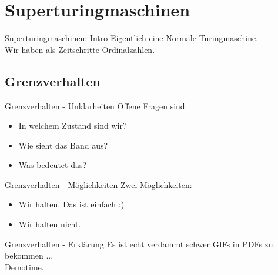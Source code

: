 \section{Superturingmaschinen}

\begin{frame}[c]{Superturingmaschinen: Intro}
    \Large
    Eigentlich eine Normale Turingmaschine. \\
    \pause
    Wir haben als Zeitschritte Ordinalzahlen.
\end{frame}

\subsection{Grenzverhalten}

\begin{frame}[c]{Grenzverhalten - Unklarheiten}
    \Large
    Offene Fragen sind:
    \begin{itemize}
            \pause
        \item In welchem Zustand sind wir?
            \pause
        \item Wie sieht das Band aus?
            \pause
        \item Was bedeutet das?
    \end{itemize}
\end{frame}


\begin{frame}[c]{Grenzverhalten - Möglichkeiten}
    \Large
    Zwei Möglichkeiten:
    \begin{itemize}
            \pause
        \item Wir halten.
            \pause
            Das ist einfach :)
            \pause
        \item Wir halten nicht.
    \end{itemize}
\end{frame}


\begin{frame}[c]{Grenzverhalten - Erklärung}
    \Large
    \pause
    Es ist echt verdammt schwer GIFs in PDFs zu bekommen ... \\
    \pause
    Demotime.
\end{frame}


